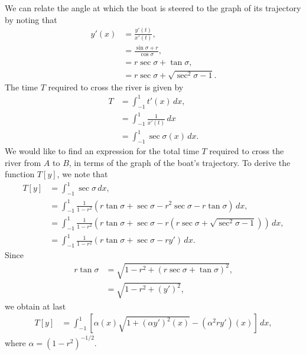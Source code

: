 We can relate the angle at which the boat is steered to the graph of its trajectory by noting that 
\begin{align*}
	y'(x) &= \frac{y'(t)}{x'(t)} ,\\
	&= \frac{\sin \sigma + r}{\cos \sigma},\\
	&= r\sec \sigma + \tan \sigma , \\
	&= r \sec \sigma + \sqrt{\sec^2 \sigma -1}.
\end{align*}
The time $T$ required to cross the river is given by
\begin{align*}
	T &= \int_{-1}^1 t'(x)\, dx, \\
	&= \int_{-1}^1 \frac{1}{x'(t)}\, dx \\ 
	&= \int_{-1}^1 \sec \sigma (x)\, dx. 
\end{align*}
We would like to find an expression for the total time $T$ required to cross the river from $A$ to $B$, in terms of the graph of the boat's trajectory. To derive the function $T[y]$, we note that 
\begin{align*}
	T[y] &= \int_{-1}^1 \sec \sigma\, dx,\\
	&= \int_{-1}^1 \frac{1}{1-r^2}(r \tan \sigma + \sec \sigma -r^2 \sec \sigma - r\tan \sigma)\, dx, \\
	&= \int_{-1}^1 \frac{1}{1-r^2}(r \tan \sigma + \sec \sigma -r(r \sec \sigma +\sqrt{\sec^2 \sigma - 1} ) )\, dx, \\
	&= \int_{-1}^1 \frac{1}{1-r^2}(r \tan \sigma + \sec \sigma -r y' )\, dx.	
\end{align*}
Since 
\begin{align*}
	r\tan \sigma  &= \sqrt{1 - r^2 + (r \sec \sigma + \tan \sigma)^2},\\
	&= \sqrt{1 - r^2 + (y')^2},
\end{align*}
we obtain at last
\begin{align}
	T[y] &= \int_{-1}^1 \left[ \alpha(x)\sqrt{1 + (\alpha y')^2(x)} - (\alpha^2 r y')(x) \right]\, dx,
\end{align}
where $\alpha = (1 - r^2)^{-1/2}$.






